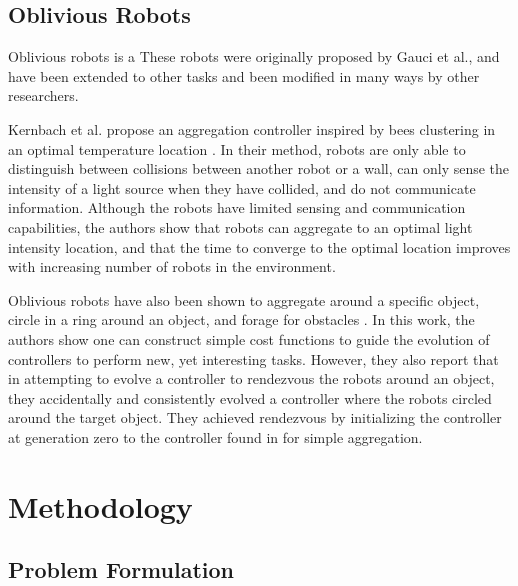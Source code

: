\documentclass[conference]{IEEEtran}
\begin{document}
  \subsection{Oblivious Robots}

    Oblivious robots is a These robots were originally proposed by Gauci et al., and have been extended to other tasks and been modified in many ways by other researchers.

    Kernbach et al. propose an aggregation controller inspired by bees clustering in an optimal temperature location \cite{kernbach_re-embodiment_2009}. In their method, robots are only able to distinguish between collisions between another robot or a wall, can only sense the intensity of a light source when they have collided, and do not communicate information. Although the robots have limited sensing and communication capabilities, the authors show that robots can aggregate to an optimal light intensity location, and that the time to converge to the optimal location improves with increasing number of robots in the environment.

    Oblivious robots have also been shown to aggregate around a specific object, circle in a ring around an object, and forage for obstacles \cite{johnson_evolving_2016}. In this work, the authors show one can construct simple cost functions to guide the evolution of controllers to perform new, yet interesting tasks. However, they also report that in attempting to evolve a controller to rendezvous the robots around an object, they accidentally and consistently evolved a controller where the robots circled around the target object. They achieved rendezvous by initializing the controller at generation zero to the controller found in \cite{gauci_self-organized_2014} for simple aggregation.

\section{Methodology}

  \subsection{Problem Formulation}
\end{document}
